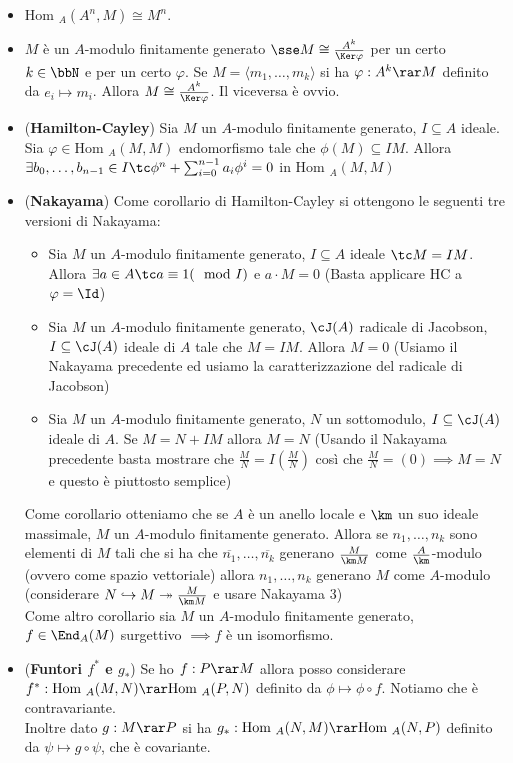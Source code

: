 \documentclass[a4paper,NoNotes,GeneralMath]{stdmdoc}
\newcommand{\srar}{\twoheadrightarrow}
\newcommand{\hrar}{\hookrightarrow}
\newcommand{\Hom}{\text{Hom }}
\newcommand{\gen}[1]{\langle {#1} \rangle}
\begin{document}
\begin{itemize}
		\item $\Hom_A(A^n, M) \cong M^n$.
		\item $M$ è un $A$-modulo finitamente generato $\sse M \cong \frac{A^k}{\Ker \varphi}$ per un certo $k \in \bbN$ e per un certo $\varphi$. Se $M = \gen{m_1, \ldots, m_k}$ si ha $\varphi: A^k \rar M$ definito da $e_i \mapsto m_i$. Allora $M \cong \frac{A^k}{\Ker \varphi}$. Il viceversa è ovvio.
		\item ({\bf Hamilton-Cayley}) Sia $M$ un $A$-modulo finitamente generato, $I \subseteq A$ ideale. Sia $\varphi \in \Hom_A(M, M)$ endomorfismo tale che $\phi(M) \subseteq IM$. Allora $\exists b_0, \ldots, b_{n-1} \in I \tc \phi^n + \sum_{i=0}^{n-1} a_i \phi^i = 0$ in $\Hom_A(M, M)$
		\item ({\bf Nakayama}) Come corollario di Hamilton-Cayley si ottengono le seguenti tre versioni di Nakayama:
			\begin{itemize}
				\item Sia $M$ un $A$-modulo finitamente generato, $I \subseteq A$ ideale $\tc M = IM$. Allora $\exists a \in A \tc a \equiv 1 (\mod I)$ e $a \cdot M = 0$ (Basta applicare HC a $\varphi = \Id$)
				\item Sia $M$ un $A$-modulo finitamente generato, $\cJ(A)$ radicale di Jacobson, $I \subseteq \cJ(A)$ ideale di $A$ tale che $M = IM$. Allora $M = 0$ (Usiamo il Nakayama precedente ed usiamo la caratterizzazione del radicale di Jacobson)
				\item Sia $M$ un $A$-modulo finitamente generato, $N$ un sottomodulo, $I \subseteq \cJ(A)$ ideale di $A$. Se $M = N + IM$ allora $M = N$ (Usando il Nakayama precedente basta mostrare che $\frac{M}{N} = I(\frac{M}{N})$ così che $\frac{M}{N} = (0) \implies M = N$ e questo è piuttosto semplice)
			\end{itemize}
			Come corollario otteniamo che se $A$ è un anello locale e $\km$ un suo ideale massimale, $M$ un $A$-modulo finitamente generato. Allora se $n_1, \ldots, n_k$ sono elementi di $M$ tali che si ha che $\overline{n_1}, \ldots, \overline{n_k}$ generano $\frac{M}{\km M}$ come $\frac{A}{\km}$-modulo (ovvero come spazio vettoriale) allora $n_1, \ldots, n_k$ generano $M$ come $A$-modulo (considerare $N \hrar M \srar \frac{M}{\km M}$ e usare Nakayama 3) \\
			Come altro corollario sia $M$ un $A$-modulo finitamente generato, $f \in \End_A(M)$ surgettivo $\implies f$ è un isomorfismo.
		\item ({\bf Funtori $f^*$ e $g_*$}) Se ho $f: P \rar M$ allora posso considerare $f^*: \Hom_A(M, N) \rar \Hom_A(P, N)$ definito da $\phi \mapsto \phi \circ f$. Notiamo che è contravariante. \\
		Inoltre dato $g: M \rar P$ si ha $g_*: \Hom_A(N, M) \rar \Hom_A(N, P)$ definito da $\psi \mapsto g \circ \psi$, che è covariante. 
	\end{itemize}
	
\end{document}
